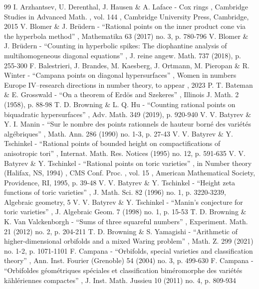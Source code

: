\documentclass[11pt]{article}
\numberwithin{equation}{section}
\theoremstyle{definition}
\numberwithin{theorem}{section}
\begin{document}
\begin{thebibliography}{99}
 I. Arzhantsev, U. Derenthal, J. Hausen \& A. Laface - Cox rings , Cambridge Studies in Advanced Math. , vol. 144 , Cambridge University Press, Cambridge, 2015
 V. Blomer \& J. Brüdern - “Rational points on the inner product cone via the hyperbola method” , Mathematika 63 (2017) no. 3, p. 780-796
 V. Blomer \& J. Brüdern - “Counting in hyperbolic spikes: The diophantine analysis of multihomogeneous diagonal equations” , J. reine angew. Math. 737 (2018), p. 255-300
 F. Balestrieri, J. Brandes, M. Kaesberg, J. Ortmann, M. Pieropan \& R. Winter - “Campana points on diagonal hypersurfaces” , Women in numbers Europe IV–research directions in number theory, to appear , 2023
 P. T. Bateman \& E. Grosswald - “On a theorem of Erdös and Szekeres” , Illinois J. Math. 2 (1958), p. 88-98
 T. D. Browning \& L. Q. Hu - “Counting rational points on biquadratic hypersurfaces” , Adv. Math. 349 (2019), p. 920-940
 V. V. Batyrev \& Y. I. Manin - “Sur le nombre des points rationnels de hauteur borné des variétés algébriques” , Math. Ann. 286 (1990) no. 1-3, p. 27-43
 V. V. Batyrev \& Y. Tschinkel - “Rational points of bounded height on compactifications of anisotropic tori” , Internat. Math. Res. Notices (1995) no. 12, p. 591-635
 V. V. Batyrev \& Y. Tschinkel - “Rational points on toric varieties” , in Number theory (Halifax, NS, 1994) , CMS Conf. Proc. , vol. 15 , American Mathematical Society, Providence, RI, 1995, p. 39-48
 V. V. Batyrev \& Y. Tschinkel - “Height zeta functions of toric varieties” , J. Math. Sci. 82 (1996) no. 1, p. 3220-3239, Algebraic geometry, 5
 V. V. Batyrev \& Y. Tschinkel - “Manin’s conjecture for toric varieties” , J. Algebraic Geom. 7 (1998) no. 1, p. 15-53
 T. D. Browning \& K. Van Valckenborgh - “Sums of three squareful numbers” , Experiment. Math. 21 (2012) no. 2, p. 204-211
 T. D. Browning \& S. Yamagishi - “Arithmetic of higher-dimensional orbifolds and a mixed Waring problem” , Math. Z. 299 (2021) no. 1-2, p. 1071-1101
 F. Campana - “Orbifolds, special varieties and classification theory” , Ann. Inst. Fourier (Grenoble) 54 (2004) no. 3, p. 499-630
 F. Campana - “Orbifoldes géométriques spéciales et classification biméromorphe des variétés kählériennes compactes” , J. Inst. Math. Jussieu 10 (2011) no. 4, p. 809-934

\end{thebibliography}
\end{document}
